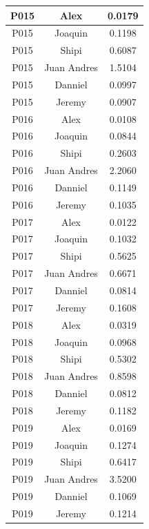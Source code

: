 \begin{longtable}{|c|c|c|}
    P015 & Alex        & 0.0179 \\ \hline
    P015 & Joaquin     & 0.1198  \\ \hline
    P015 & Shipi       & 0.6087 \\ \hline
    P015 & Juan Andres & 1.5104 \\ \hline
    P015 & Danniel     & 0.0997 \\ \hline
    P015 & Jeremy      & 0.0907 \\ \hline

    P016 & Alex        & 0.0108 \\ \hline
    P016 & Joaquin     & 0.0844 \\ \hline
    P016 & Shipi       & 0.2603 \\ \hline
    P016 & Juan Andres & 2.2060 \\ \hline
    P016 & Danniel     & 0.1149 \\ \hline
    P016 & Jeremy      & 0.1035 \\ \hline

    P017 & Alex        & 0.0122 \\ \hline
    P017 & Joaquin     & 0.1032 \\ \hline
    P017 & Shipi       & 0.5625 \\ \hline
    P017 & Juan Andres & 0.6671 \\ \hline
    P017 & Danniel     & 0.0814 \\ \hline
    P017 & Jeremy      & 0.1608 \\ \hline

    P018 & Alex        & 0.0319 \\ \hline
    P018 & Joaquin     & 0.0968 \\ \hline
    P018 & Shipi       & 0.5302 \\ \hline
    P018 & Juan Andres & 0.8598 \\ \hline
    P018 & Danniel     & 0.0812 \\ \hline
    P018 & Jeremy      & 0.1182 \\ \hline

    P019 & Alex        & 0.0169 \\ \hline
    P019 & Joaquin     & 0.1274 \\ \hline
    P019 & Shipi       & 0.6417 \\ \hline
    P019 & Juan Andres & 3.5200 \\ \hline
    P019 & Danniel     & 0.1069 \\ \hline
    P019 & Jeremy      & 0.1214 \\ \hline


\end{longtable}
